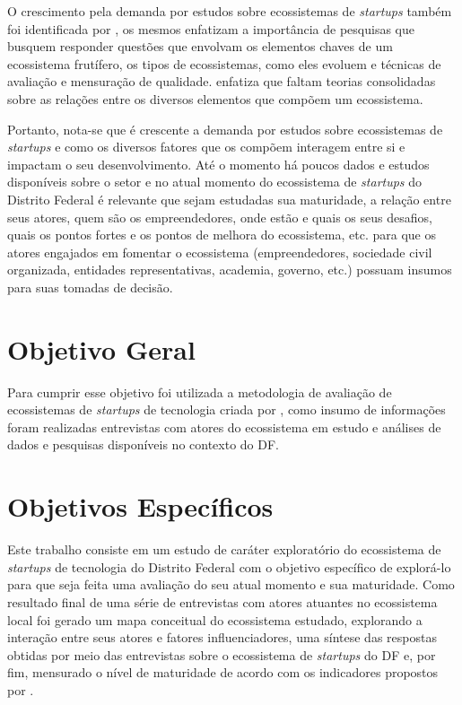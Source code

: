O crescimento pela demanda por estudos sobre ecossistemas de \textit{startups} também foi identificada por , os mesmos enfatizam a importância de pesquisas que busquem responder questões que envolvam os elementos chaves de um ecossistema frutífero, os tipos de ecossistemas, como eles evoluem e técnicas de avaliação e mensuração de qualidade.  enfatiza que faltam teorias consolidadas sobre as relações entre os diversos elementos que compõem um ecossistema.

Portanto, nota-se que é crescente a demanda por estudos sobre ecossistemas de \textit{startups} e como os diversos fatores que os compõem interagem entre si e impactam o seu desenvolvimento. Até o momento há poucos dados e estudos disponíveis sobre o setor e no atual momento do ecossistema de \textit{startups} do Distrito Federal é relevante que sejam estudadas sua maturidade, a relação entre seus atores, quem são os empreendedores, onde estão e quais os seus desafios, quais os pontos fortes e os pontos de melhora do ecossistema, etc. para que os atores engajados em fomentar o ecossistema (empreendedores, sociedade civil organizada, entidades representativas, academia, governo, etc.) possuam insumos para suas tomadas de decisão. 

\section{Objetivo Geral}
\label{section:objetivo_geral}

Para cumprir esse objetivo foi utilizada a metodologia de avaliação de ecossistemas de \textit{startups} de tecnologia criada por , como insumo de informações foram realizadas entrevistas com atores do ecossistema em estudo e análises de dados e pesquisas disponíveis no contexto do DF.

\section{Objetivos Específicos}
\label{section:objetivos_especificos}

Este trabalho consiste em um estudo de caráter exploratório do ecossistema de \textit{startups} de tecnologia do Distrito Federal com o objetivo específico de explorá-lo para que seja feita uma avaliação do seu atual momento e sua maturidade. Como resultado final de uma série de entrevistas com atores atuantes no ecossistema local foi gerado um mapa conceitual do ecossistema estudado, explorando a interação entre seus atores e fatores influenciadores, uma síntese das respostas obtidas por meio das entrevistas sobre o ecossistema de \textit{startups} do DF e, por fim, mensurado o nível de maturidade de acordo com os indicadores propostos por .


